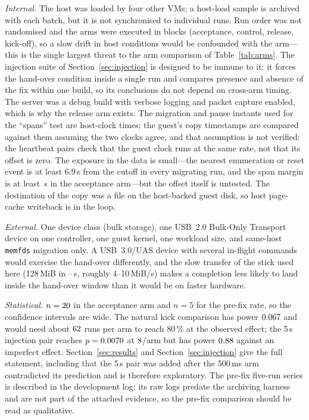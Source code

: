 \documentclass[10pt,conference]{IEEEtran}
\newcommand{\code}[1]{\texttt{#1}}
\begin{document}
\emph{Internal.} The host was loaded by four other VMs; a host-load sample is
archived with each batch, but it is not synchronised to individual runs. Run
order was not randomised and the arms were executed in blocks (acceptance,
control, release, kick-off), so a slow drift in host conditions would be
confounded with the arm---this is the single largest threat to the arm
comparison of Table~\ref{tab:arms}. The injection suite of
Section~\ref{sec:injection} is designed to be immune to it: it forces the
hand-over condition inside a single run and compares presence and absence of the
fix within one build, so its conclusions do not depend on cross-arm timing. The
server was a debug build with verbose logging and packet capture enabled, which
is why the release arm exists. The migration and pause instants used for the
``spans'' test are host-clock times; the guest's copy timestamps are compared
against them assuming the two clocks agree, and that assumption is not verified:
the heartbeat pairs check that the guest clock runs at the same rate, not that
its offset is zero. The exposure in the data is small---the nearest enumeration
or reset event is at least 6.9\,s from the cutoff in every migrating run, and the
span margin is at least \SpanMarginMin\,s in the acceptance arm---but the offset itself is untested. The destination of
the copy was a file on the host-backed guest disk, so host page-cache writeback
is in the loop.

\emph{External.} One device class (bulk storage), one USB~2.0 Bulk-Only
Transport device on one controller, one guest kernel, one workload size, and
same-host \code{memfds} migration only. A USB~3.0/UAS device with several
in-flight commands would exercise the hand-over differently, and the slow
transfer of the stick used here (128\,MiB in \CopyMin--\CopyMax\,s, roughly
4--10\,MiB/s) makes a completion less
likely to land inside the hand-over window than it would be on faster hardware.

\emph{Statistical.} $n=20{}$ in the acceptance arm and $n=5$ for the
pre-fix rate, so the confidence intervals are wide. The natural kick comparison
has power $0.067$ and would need about $62$ runs per
arm to reach 80\,\% at the observed effect; the 5\,s injection pair reaches
$p=0.0070$ at $8$/arm but has power $0.88$ against
an imperfect effect. Section~\ref{sec:results} and Section~\ref{sec:injection}
give the full statement, including that the 5\,s pair was added after the
500\,ms arm contradicted its prediction and is therefore exploratory.
The pre-fix five-run series is described in the development log; its raw logs
predate the archiving harness and are not part of the attached evidence, so the
pre-fix comparison should be read as qualitative.
\end{document}
